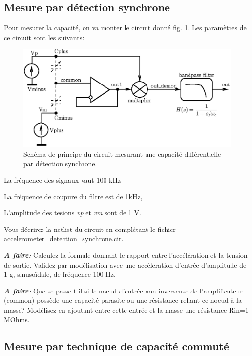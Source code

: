 \documentclass[12pt,A4,onecolumn,french]{article}
\begin{document}
\subsection{Mesure par détection synchrone}

Pour mesurer la capacité, on va monter le circuit donné fig. \ref{fig:detection_synchrone}. Les paramètres de ce circuit sont les suivants:

\begin{figure}
 \centering
 \includegraphics{measurement_modulation.eps}
 \caption{Schéma de principe du circuit mesurant une capacité différentielle par
détection synchrone. \label{fig:detection_synchrone}}
\end{figure}

La fréquence des signaux vaut 100 kHz

La fréquence de coupure du filtre est de 1kHz,

L'amplitude des tesions \emph{vp} et \emph{vm} sont de 1 V. 

Vous décrirez la netlist du circuit en complétant le fichier accelerometer\_detection\_synchrone.cir.

\emph{\bf A faire:} Calculez la formule donnant le rapport entre l'accélération et la tension de sortie.  Validez par modélisation avec une accéleration d'entrée d'amplitude de 1 g, sinusoïdale, de fréquence 100 Hz. 

\emph{\bf A faire:} Que se passe-t-il si le noeud d'entrée non-inverseuse de
l'amplificateur (common) possède une capacité
parasite ou une résistance reliant ce noeud à la masse? Modélisez en ajoutant
entre cette entrée et la masse une résistance Rin=1 MOhms.

\subsection{Mesure par technique de capacité commuté}
\end{document}
